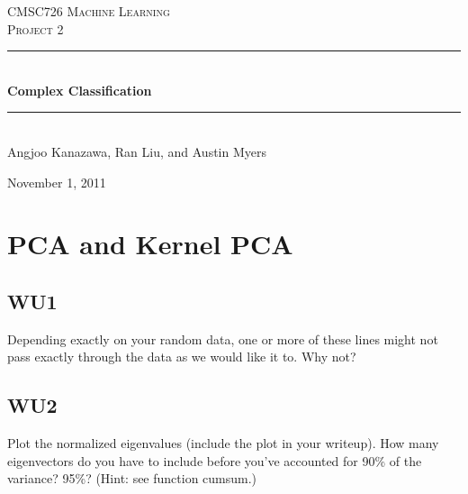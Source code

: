 \documentclass[a4paper,11pt]{article}
\newcommand{\HRule}{\rule{\linewidth}{0.5mm}}
\begin{document}
\begin{titlepage}
\begin{center}

\textsc{\LARGE CMSC726 Machine Learning}\\[1.5cm]

\textsc{\Large Project 2}\\[0.5cm]

\HRule \\[0.5cm]

{ \huge \bfseries Complex Classification}\\[0.4cm]

\HRule \\[1.5cm]

{\large Angjoo Kanazawa, Ran Liu, and Austin Myers}

\vfill

{\large November 1, 2011}

\end{center}
\end{titlepage}
{}

\section{PCA and Kernel PCA}
\subsection{WU1}
\textsf{Depending exactly on your random data, one or more of these lines might not pass exactly through the data as we would like it to. Why not?}\\


\subsection{WU2}
\textsf{Plot the normalized eigenvalues (include the plot in your writeup). How many eigenvectors do you have to include before you've accounted for 90\% of the variance? 95\%? (Hint: see function cumsum.)}\\

\end{document}
